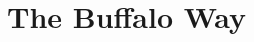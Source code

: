 \documentclass{subfile}
\begin{document}
	\chapter{The Buffalo Way}\label{ch:buffalo}%
\end{document}
